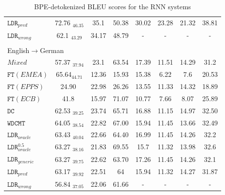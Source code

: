 \documentclass[11pt,a4paper]{article}
\begin{document}
\begin{table}[!h]
\begin{center}
{\begin{tabular}{|l|ccc|ccc||c|}
$\mathtt{LDR}_{pred}$        & 72.76 $_{46.35}$ & 35.1 & 50.38 & 30.02 & 23.28 & 21.32 & 38.81\\
$\mathtt{LDR}_{wrong}$   & 62.1 $_{43.29}$ & 34.17 & 48.79 &  - & - & - & - \\
\hline
\multicolumn{8}{l}{} \\[-9pt]
\multicolumn{8}{l}{English$\rightarrow$German} \\
\hline
$Mixed$               & 57.37 $_{37.94}$ & 23.1 & 63.54 & 17.39 & 11.51 & 14.29 & 31.2\\
\hline
$\mathtt{FT} (EMEA)$  & 65.64$_{44.71}$ & 12.36 & 15.93 & 15.38 & 6.22 & 7.6  & 20.53\\
$\mathtt{FT} (EPPS)$   & 24.90 $ $ & 22.98 & 26.26 & 13.55 & 11.33 & 14.32 & 18.89 \\
$\mathtt{FT} (ECB)$    & 41.8 $ $ & 15.97 & 71.07 & 10.77 & 7.66 & 8.07 & 25.89\\
\hline
$\mathtt{DC}$                      & 62.53 $_{39.25}$ & 23.74 & 65.71 & 16.88 & 11.15 & 14.97 & 32.50\\
\hline
$\mathtt{WDCMT}$ & 64.05 $_{38.54}$ & 22.82 & 67.00 & 15.94 & 11.45 & 13.66 & 32.49\\
\hline
$\mathtt{LDR}_{oracle}$   & 63.43 $_{40.04}$ & 22.66 & 64.40 & 16.99 & 11.45 & 14.26 & 32.2\\
$\mathtt{LDR}_{oracle}^{0.5}$   & 63.27 $_{38.16}$ & 21.83 & 69.55 & 15.7 & 11.32 & 13.98 & 32.6\\
$\mathtt{LDR}_{generic}$ & 63.27 $_{39.75}$ & 22.62 & 63.70 & 17.26 & 11.45 & 14.26 & 32.1\\
$\mathtt{LDR}_{pred}$        & 63.17 $_{39.92}$ & 22.51 & 64 & 15.94 & 11.32 & 14.27 & 31.87\\
$\mathtt{LDR}_{wrong}$   & 56.84 $_{37.05}$ & 22.06 & 61.66 & - & - & - & - \\
\hline
\end{tabular}
} %
\end{center}
\caption{BPE-detokenized BLEU scores for the RNN systems\label{tab:results-rnn}}
\end{table}
\end{document}
